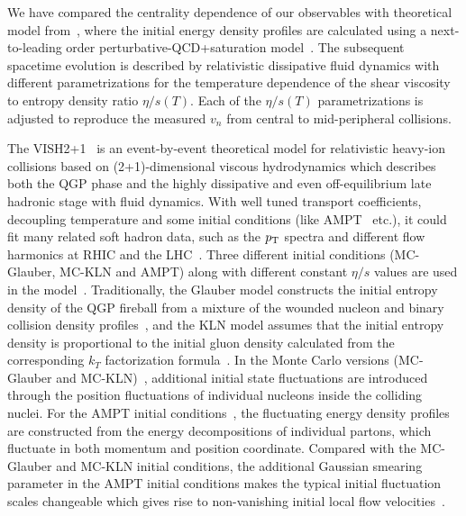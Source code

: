 \documentclass[ALICE,manyauthors]{cernphprep}
\begin{document}
We have compared the centrality dependence of our observables with theoretical model from~\cite{Niemi:2015qia}, where the initial energy density profiles are calculated using a next-to-leading order perturbative-QCD+saturation model~\cite{Paatelainen:2012at,Paatelainen:2013eea}. The subsequent spacetime evolution is described by relativistic dissipative fluid dynamics with different parametrizations for the temperature dependence of the shear viscosity to entropy density ratio $\eta/s(T)$. Each of the $\eta/s(T)$ parametrizations is adjusted to reproduce the measured $v_n$ from central to mid-peripheral collisions. 

The VISH2+1~\cite{Shen:2010uy,Shen:2014vra} is an event-by-event theoretical model for relativistic heavy-ion collisions based on (2+1)-dimensional viscous hydrodynamics which describes both the QGP phase and the highly dissipative and even off-equilibrium late hadronic stage with fluid dynamics. With well tuned transport coefficients, decoupling temperature  and some initial conditions (like {AMPT}~\cite{Xu:2016hmp,Bhalerao:2015iya,Pang:2012he} etc.), it could fit many related soft hadron data, such as the $p_{\rm T}$ spectra and different flow harmonics at RHIC and the LHC~\cite{Qiu:2011hf, Shen:2010uy, Shen:2011eg, Bhalerao:2015iya}.
Three different initial conditions ({MC-Glauber}, {MC-KLN} and {AMPT}) along with different constant $\eta/s$ values are used in the model~\cite{Zhu:2016puf}. 
Traditionally, the Glauber model constructs the initial entropy density of the QGP fireball from a mixture of the wounded nucleon and binary collision density profiles~\cite{Kolb:2000sd}, and the {KLN} model assumes that the initial entropy density is proportional to the initial gluon density calculated from the corresponding $k_T$ factorization formula~\cite{Kharzeev:2000ph}. In the Monte Carlo versions ({MC-Glauber} and {MC-KLN})~\cite{Miller:2007ri,Drescher:2006ca,Hirano:2009ah}, additional initial state fluctuations are introduced through the position fluctuations of individual nucleons inside the colliding nuclei. For the {AMPT} initial conditions~\cite{Bhalerao:2015iya,Pang:2012he,Xu:2016hmp}, the fluctuating energy density profiles are constructed from the energy decompositions of individual partons, which fluctuate in both momentum and position coordinate. Compared with the {MC-Glauber} and {MC-KLN} initial conditions, the additional Gaussian smearing parameter in the {AMPT} initial conditions makes the typical initial fluctuation scales changeable which gives rise to non-vanishing initial local flow velocities~\cite{Pang:2012he}.
\end{document}

